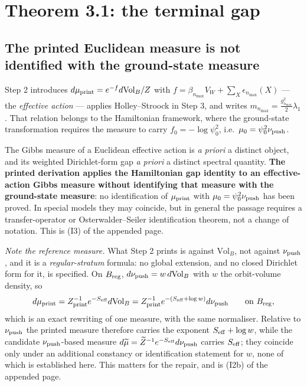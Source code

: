 \documentclass[11pt]{article}
\begin{document}
\section{Theorem 3.1: the terminal gap}

\subsection{The printed Euclidean measure is not identified with the ground-state
measure}

Step 2 introduces $d\mu_{\rm print}=e^{-f}d\mathrm{Vol}_B/Z$ with
$f=\beta_{n_{\max}}V_W+\sum_X\epsilon_{n_{\max}}(X)$ --- the \emph{effective action} ---
applies Holley--Stroock in Step 3, and writes
$m_{n_{\max}}=\frac{g_{n_{\max}}^2}{2}\lambda_1$. That relation belongs to the
Hamiltonian framework, where the ground-state transformation requires the measure to
carry $f_0=-\log\psi_0^2$, i.e.\ $\mu_0=\psi_0^2\nu_{\rm push}$.

The Gibbs measure of a Euclidean effective action is \emph{a priori} a distinct
object, and its weighted Dirichlet-form gap \emph{a priori} a distinct spectral
quantity. \textbf{The printed derivation applies the Hamiltonian gap identity to an
effective-action Gibbs measure without identifying that measure with the ground-state
measure}: no identification of $\mu_{\rm print}$ with $\mu_0=\psi_0^2\nu_{\rm push}$ has been
proved. In special models they may coincide, but in general the passage requires a
transfer-operator or Osterwalder--Seiler identification theorem, not a change of
notation. This is (I3) of the appended page.

\emph{Note the reference measure.} What Step 2 prints is against
$\mathrm{Vol}_B$, not against $\nu_{\rm push}$, and it is a \emph{regular-stratum}
formula: no
global extension, and no closed Dirichlet form for it, is specified. On $B_{\rm reg}$,
$d\nu_{\rm push}=w\,d\mathrm{Vol}_B$ with $w$ the orbit-volume density, so
\[
d\mu_{\rm print}=Z_{\rm print}^{-1}e^{-S_{\rm eff}}d\mathrm{Vol}_B
=Z_{\rm print}^{-1}e^{-(S_{\rm eff}+\log w)}d\nu_{\rm push}
\qquad\text{on }B_{\rm reg},
\]
which is an exact rewriting of one measure, with the same normaliser. Relative to
$\nu_{\rm push}$ the printed measure therefore carries the exponent
$S_{\rm eff}+\log w$, while the candidate $\nu_{\rm push}$-based measure
$d\widetilde\mu=\widetilde Z^{-1}e^{-S_{\rm eff}}d\nu_{\rm push}$ carries
$S_{\rm eff}$; they
coincide only under an additional constancy or identification statement for $w$, none
of which is established here. This matters for the repair, and is (I2b) of the
appended page.
\end{document}
